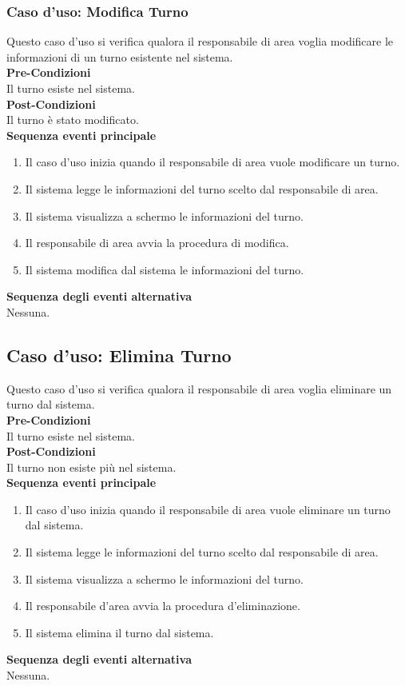 \documentclass[green, fancy, 11pt]{elegantbook}
\begin{document}
\subsubsection{Caso d’uso: Modifica Turno}
\noindent
Questo caso d’uso si verifica qualora il responsabile di area voglia modificare le informazioni di un turno esistente nel sistema.\\
\textbf{Pre-Condizioni}\\
Il turno esiste nel sistema.\\
\textbf{Post-Condizioni}\\
Il turno è stato modificato.\\
\textbf{Sequenza eventi principale}\\
\begin{enumerate}
    \item Il caso d’uso inizia quando il responsabile di area vuole modificare un turno.
	\item Il sistema legge le informazioni del turno scelto dal responsabile di area.
	\item Il sistema visualizza a schermo le informazioni del turno.
	\item Il responsabile di area avvia la procedura di modifica.
	\item Il sistema modifica dal sistema le informazioni del turno.
\end{enumerate}
\textbf{Sequenza degli eventi alternativa}\\
Nessuna.

\subsection{Caso d'uso: Elimina Turno}
\noindent
Questo caso d’uso si verifica qualora il responsabile di area voglia eliminare un turno dal sistema.\\
\textbf{Pre-Condizioni}\\
Il turno esiste nel sistema.\\
\textbf{Post-Condizioni}\\
Il turno non esiste più nel sistema.\\
\textbf{Sequenza eventi principale}
\begin{enumerate}
	\item Il caso d’uso inizia quando il responsabile di area vuole eliminare un turno dal sistema.
	\item Il sistema legge le informazioni del turno scelto dal responsabile di area.
	\item Il sistema visualizza a schermo le informazioni del turno.
	\item Il responsabile d’area avvia la procedura d’eliminazione.
	\item Il sistema elimina il turno dal sistema.
\end{enumerate}
\textbf{Sequenza degli eventi alternativa}\\
Nessuna.
\newpage
\end{document}
